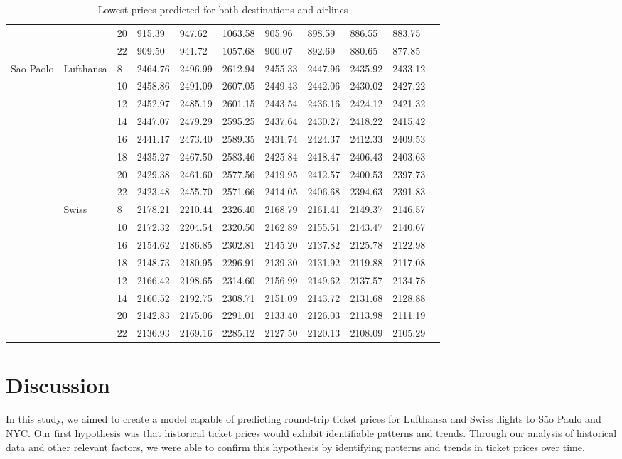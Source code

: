 \begin{table}[h!]
\begin{tabular}{l l l l l l l l l l l}
  & & 20 & 915.39 & 947.62  & 1063.58 & 905.96& 898.59 & 886.55&883.75\\
  & & 22 & 909.50 & 941.72 & 1057.68 & 900.07 & 892.69 &880.65 & 877.85\\
  Sao Paolo & Lufthansa & 8 & 2464.76 & 2496.99 & 2612.94 & 2455.33 & 2447.96 & 2435.92 & 2433.12\\
  & & 10 & 2458.86 & 2491.09 & 2607.05 & 2449.43 & 2442.06 & 2430.02 & 2427.22\\
  & & 12 & 2452.97 & 2485.19 & 2601.15 & 2443.54 & 2436.16 & 2424.12 & 2421.32\\
  & & 14 & 2447.07 & 2479.29 & 2595.25 & 2437.64 & 2430.27 & 2418.22 & 2415.42\\
  & & 16 & 2441.17 & 2473.40 & 2589.35 & 2431.74 & 2424.37 & 2412.33 & 2409.53\\
  & & 18 & 2435.27 & 2467.50 & 2583.46 & 2425.84 & 2418.47 & 2406.43 & 2403.63\\
  & & 20 & 2429.38 & 2461.60 & 2577.56 & 2419.95 & 2412.57 & 2400.53 & 2397.73\\
  & & 22 & 2423.48 & 2455.70 & 2571.66 & 2414.05 & 2406.68 & 2394.63 & 2391.83\\
  & Swiss& 8 & 2178.21 & 2210.44 & 2326.40 & 2168.79 & 2161.41 & 2149.37 & 2146.57\\
  & & 10 & 2172.32 & 2204.54 & 2320.50 & 2162.89 & 2155.51 & 2143.47 & 2140.67\\
  & & 16 & 2154.62 & 2186.85 & 2302.81 & 2145.20 & 2137.82 & 2125.78 & 2122.98\\
  & & 18 & 2148.73 & 2180.95 & 2296.91 & 2139.30 & 2131.92 & 2119.88 & 2117.08\\
  & & 12 & 2166.42 & 2198.65 & 2314.60 & 2156.99 & 2149.62 & 2137.57 & 2134.78\\
  & & 14 & 2160.52 & 2192.75 & 2308.71 & 2151.09 & 2143.72 & 2131.68 & 2128.88\\
  & & 20 & 2142.83 & 2175.06 & 2291.01 & 2133.40 & 2126.03 & 2113.98 & 2111.19\\
  & & 22 & 2136.93 & 2169.16 & 2285.12 & 2127.50 & 2120.13 & 2108.09 & 2105.29\\
  \end{tabular}
  \caption{Lowest prices predicted for both destinations and airlines}
  \label{tab:pred}
\end{table}

\section{Discussion}
\label{chap:discussion}
In this study, we aimed to create a model capable of predicting round-trip ticket prices for Lufthansa and Swiss flights to São Paulo and NYC.
Our first hypothesis was that historical ticket prices would exhibit identifiable patterns and trends.
Through our analysis of historical data and other relevant factors, we were able to confirm this hypothesis by identifying patterns and trends in ticket prices over time.


